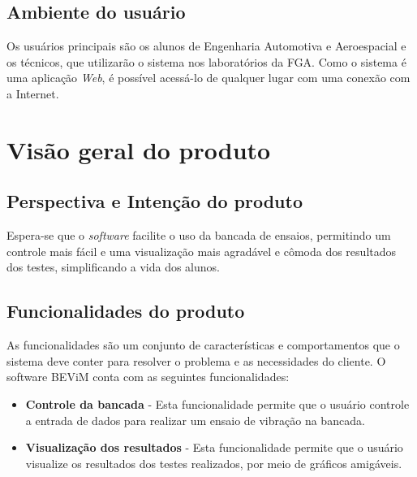      
	\subsection*{Ambiente do usuário}
    	
        Os usuários principais são os alunos de Engenharia Automotiva e Aeroespacial e os técnicos, que utilizarão o sistema nos laboratórios da FGA. Como o sistema é uma aplicação \textit{Web}, é possível acessá-lo de qualquer lugar com uma conexão com a Internet.
        
   
\section*{Visão geral do produto}

	\subsection*{Perspectiva e Intenção do produto}
    	Espera-se que o \textit{software} facilite o uso da bancada de ensaios, permitindo um controle mais fácil e uma visualização mais agradável e cômoda dos resultados dos testes, simplificando a vida dos alunos.
        
    \subsection*{Funcionalidades do produto}
    
    	As funcionalidades são um conjunto de características e comportamentos que o sistema deve conter para resolver o problema e as necessidades do cliente. O software BEViM conta com as seguintes funcionalidades:
        
        \begin{itemize}
          	\item \textbf{Controle da bancada} - Esta funcionalidade permite que o usuário controle a entrada de dados para realizar um ensaio de vibração na bancada.
            \item \textbf{Visualização dos resultados} - Esta funcionalidade permite que o usuário visualize os resultados dos testes realizados, por meio de gráficos amigáveis.
        \end{itemize}
    
